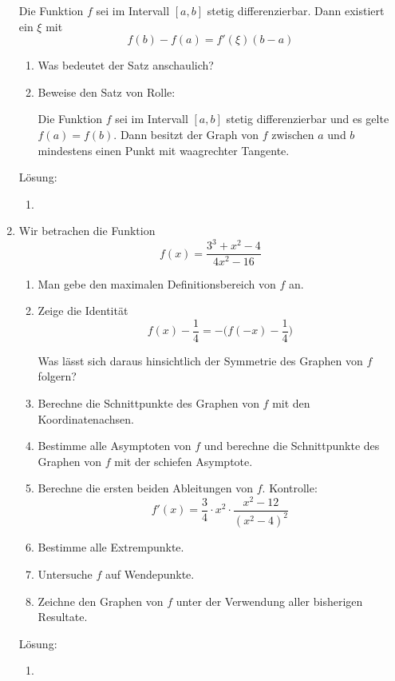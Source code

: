 \documentclass[../main.tex]{subfiles}
\begin{document}
\begin{enumerate}
	      Die Funktion \( f \) sei im Intervall \( [a,b] \) stetig differenzierbar.
	      Dann existiert ein \( \xi \) mit
	      \[ f(b) - f(a)  = f'( \xi )( b - a ) \]
	      \begin{enumerate}
		      \item Was bedeutet der Satz anschaulich?
		      \item Beweise den Satz von Rolle:

		            Die Funktion \( f \) sei im Intervall \( [a,b] \) stetig differenzierbar und
		            es gelte \( f(a) = f(b) \). Dann besitzt der Graph von \( f \) zwischen
		            \( a \) und \( b \) mindestens einen Punkt mit waagrechter Tangente.
	      \end{enumerate}
		  
		  Lösung:
		  \begin{enumerate}
			  \item 
		  \end{enumerate}
	\item Wir betrachen die Funktion
	      \[ f(x) = \frac{ 3^3 + x^2 - 4 }{
			      4x^2 - 16
		      } \]
	      \begin{enumerate}
		      \item Man gebe den maximalen Definitionsbereich von \( f \) an.
		      \item Zeige die Identität
		            \[ f(x) - \frac{1}{4} = - \Bigg( f(-x) - \frac{1}{4} \Bigg)  \]

		            Was lässt sich daraus hinsichtlich der Symmetrie des Graphen von
		            \( f \) folgern?
		      \item Berechne die Schnittpunkte des Graphen von \( f \)  mit den Koordinatenachsen.
		      \item Bestimme alle Asymptoten von \( f \) und berechne die Schnittpunkte des
		            Graphen von \( f \)  mit der schiefen Asymptote.
		      \item Berechne die ersten beiden Ableitungen von \( f \).
		            Kontrolle:
		            \[ f'(x) = \frac{3}{4} \cdot x^2 \cdot \frac{ x^2 - 12 }{ (x^2 - 4)^2 } \]
		      \item Bestimme alle Extrempunkte.
		      \item Untersuche \( f \) auf Wendepunkte.
		      \item Zeichne den Graphen von \( f \) unter der Verwendung aller bisherigen Resultate.
	      \end{enumerate}
		  
		  Lösung:
		  \begin{enumerate}
			  \item 
		  \end{enumerate}
\end{enumerate}
\end{document}
